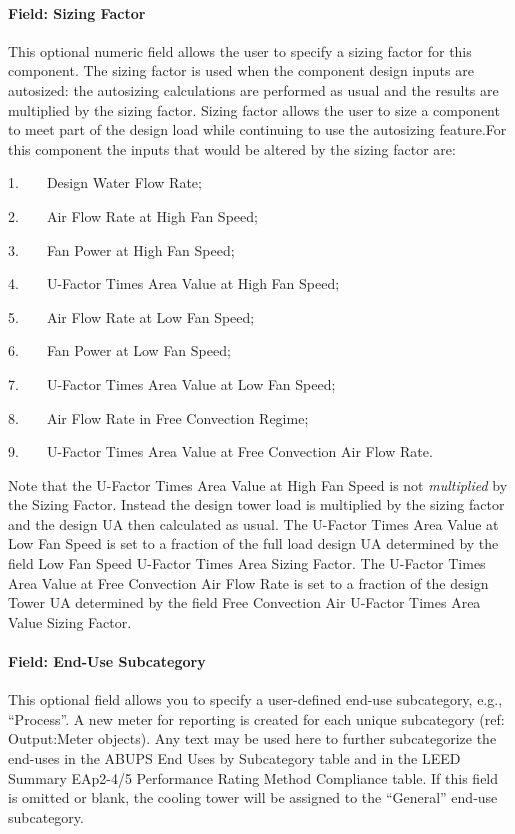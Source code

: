 \paragraph{Field: Sizing Factor}\label{field-sizing-factor}

This optional numeric field allows the user to specify a sizing factor for this component. The sizing factor is used when the component design inputs are autosized: the autosizing calculations are performed as usual and the results are multiplied by the sizing factor. Sizing factor allows the user to size a component to meet part of the design load while continuing to use the autosizing feature.For this component the inputs that would be altered by the sizing factor are:

1.~~~~Design Water Flow Rate;

2.~~~~Air Flow Rate at High Fan Speed;

3.~~~~Fan Power at High Fan Speed;

4.~~~~U-Factor Times Area Value at High Fan Speed;

5.~~~~Air Flow Rate at Low Fan Speed;

6.~~~~Fan Power at Low Fan Speed;

7.~~~~U-Factor Times Area Value at Low Fan Speed;

8.~~~~Air Flow Rate in Free Convection Regime;

9.~~~~U-Factor Times Area Value at Free Convection Air Flow Rate.

Note that the U-Factor Times Area Value at High Fan Speed is not \emph{multiplied} by the Sizing Factor. Instead the design tower load is multiplied by the sizing factor and the design UA then calculated as usual. The U-Factor Times Area Value at Low Fan Speed is set to a fraction of the full load design UA determined by the field Low Fan Speed U-Factor Times Area Sizing Factor. The U-Factor Times Area Value at Free Convection Air Flow Rate is set to a fraction of the design Tower UA determined by the field Free Convection Air U-Factor Times Area Value Sizing Factor.

\paragraph{Field: End-Use Subcategory}\label{end-use-subcategory-02}

This optional field allows you to specify a user-defined end-use subcategory, e.g., ``Process''. A new meter for reporting is created for each unique subcategory (ref: Output:Meter objects). Any text may be used here to further subcategorize the end-uses in the ABUPS End Uses by Subcategory table and in the LEED Summary EAp2-4/5 Performance Rating Method Compliance table. If this field is omitted or blank, the cooling tower will be assigned to the ``General'' end-use subcategory.

